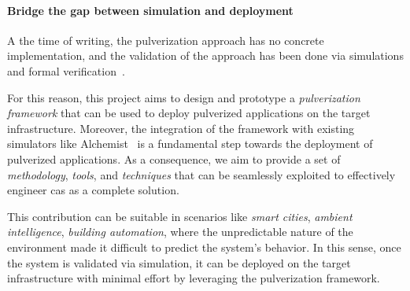 \documentclass[12pt,a4paper]{article}
\begin{document}
\paragraph{Bridge the gap between simulation and deployment}\label{sec:bridge-gap}

A the time of writing,
the pulverization approach has no concrete implementation,
and the validation of the approach has been done via simulations and formal verification~\cite{DBLP:journals/fi/CasadeiPPVW20, DBLP:journals/iotj/CasadeiFPPSV22}.

For this reason,
this project aims to design and prototype a \emph{pulverization framework} that can be used to deploy pulverized applications on the target infrastructure.
%
Moreover,
the integration of the framework with existing simulators like Alchemist~\cite{DBLP:journals/jos/PianiniMV13} is a fundamental step towards the deployment of pulverized applications.
%
As a consequence,
we aim to provide a set of \emph{methodology},
\emph{tools},
and \emph{techniques} that can be seamlessly exploited to effectively engineer \ac{cas} as a complete solution.

This contribution can be suitable in scenarios like \emph{smart cities},
\emph{ambient intelligence},
\emph{building automation},
where the unpredictable nature of the environment made it difficult to predict the system's behavior.
%
In this sense, once the system is validated via simulation,
it can be deployed on the target infrastructure with minimal effort by leveraging the pulverization framework.
\end{document}
